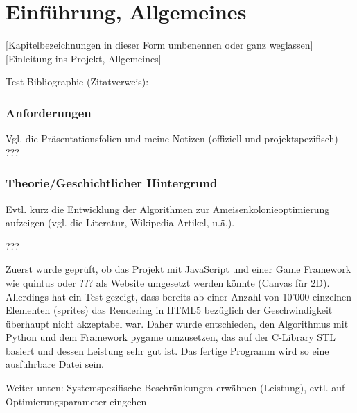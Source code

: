 
\chapter{Einführung, Allgemeines}

[Kapitelbezeichnungen in dieser Form umbenennen oder ganz weglassen] \\

[Einleitung ins Projekt, Allgemeines]

\vspace*{1cm}

Test Bibliographie (Zitatverweis): \cite[S. 115]{ds-ant}



\subsection{Anforderungen}

Vgl. die Präsentationsfolien und meine Notizen (offiziell und projektspezifisch) \\
 
???


\subsection{Theorie/Geschichtlicher Hintergrund} 

Evtl. kurz die Entwicklung der Algorithmen zur Ameisenkolonieoptimierung aufzeigen (vgl. die Literatur, Wikipedia-Artikel, u.ä.).

???


\vspace*{1cm}

Zuerst wurde geprüft, ob das Projekt mit JavaScript und einer Game Framework wie quintus oder ??? als Website umgesetzt werden könnte (Canvas für 2D). Allerdings hat ein Test gezeigt, dass bereits ab einer Anzahl von 10'000 einzelnen Elementen (sprites) das Rendering in HTML5 bezüglich der Geschwindigkeit überhaupt nicht akzeptabel war. Daher wurde entschieden, den Algorithmus mit Python und dem Framework pygame umzusetzen, das auf der C-Library STL basiert und dessen Leistung sehr gut ist. Das fertige Programm wird so eine ausführbare Datei sein.

\vspace*{1cm}

Weiter unten: Systemspezifische Beschränkungen erwähnen (Leistung), evtl. auf Optimierungsparameter eingehen


